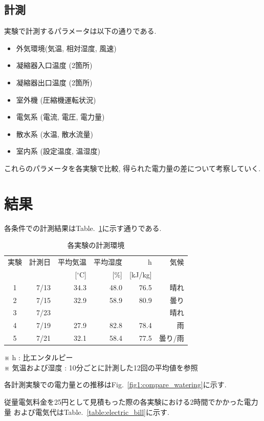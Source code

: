 \documentclass[a4j,fleqn,dvipdfmx,uplatex]{jsarticle}
\newcommand{\figref}[1]{Fig.\ \ref{#1}}
\newcommand{\tableref}[1]{Table.\ \ref{#1}}
\begin{document}
\subsection{計測}
実験で計測するパラメータは以下の通りである. 

\begin{itemize}
  \item 外気環境(気温, 相対湿度, 風速)
  \item 凝縮器入口温度 (2箇所)
  \item 凝縮器出口温度 (2箇所)
  \item 室外機 (圧縮機運転状況)
  \item 電気系 (電流, 電圧, 電力量)
  \item 散水系 (水温, 散水流量)
  \item 室内系 (設定温度, 温湿度)
\end{itemize}

これらのパラメータを各実験で比較, 得られた電力量の差について考察していく. 

\section{結果}\label{sec3}
各条件での計測結果は\tableref{table:ex}に示す通りである. 

\begin{table}[htb]
  \caption{各実験の計測環境}
  \label{table:ex}
  \centering
  \begin{tabular}{crrrrr}
    \small 実験 & \small 計測日 & \small 平均気温 & \small 平均湿度 & \small h & \small 気候 \\[-1.5mm]
     & & \small [$^\circ$C] & \small [\%] & \small [kJ/kg] &  \\
    \hline \hline
    1 & 7/13 & 34.3 & 48.0 & 76.5 & 晴れ  \\
    2 & 7/15 & 32.9 & 58.9 & 80.9 & 曇り \\
    3 & 7/23 &  &  &  & 晴れ \\
    4 & 7/19 & 27.9 & 82.8 & 78.4 & 雨 \\
    5 & 7/21 & 32.1 & 58.4 & 77.5 & 曇り/雨 \\
    \hline
  \end{tabular}
    \small ※ h : 比エンタルピー\\※ 気温および湿度 : 10分ごとに計測した12回の平均値を参照
\end{table}

各計測実験での電力量との推移は\figref{fig1:compare_watering}に示す. 

従量電気料金を25円として見積もった際の各実験における2時間でかかった電力量
および電気代は\tableref{table:electric_bill}に示す. 
\end{document}
